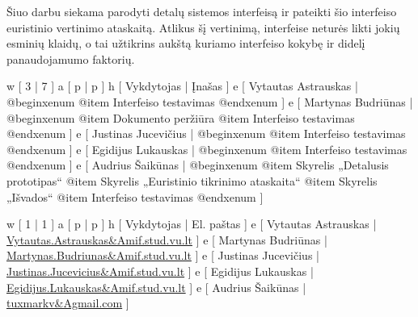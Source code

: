 
Šiuo darbu siekama parodyti detalų sistemos interfeisą ir pateikti šio interfeiso
euristinio vertinimo ataskaitą. Atlikus šį vertinimą, interfeise neturės likti
jokių esminių klaidų, o tai užtikrins aukštą kuriamo interfeiso kokybę ir didelį
panaudojamumo faktorių.

\xtable
{
  w [ 3  | 7 ]
  a [ p  | p ]
  h [ Vykdytojas | Įnašas ]
  e [ Vytautas Astrauskas
  | @begin{xenum} 
      @item Interfeiso testavimas
    @end{xenum}
  ]
  e [ Martynas Budriūnas
  | @begin{xenum} 
      @item Dokumento peržiūra
      @item Interfeiso testavimas
    @end{xenum}
  ]
  e [ Justinas Jucevičius 
  | @begin{xenum} 
      @item Interfeiso testavimas
    @end{xenum}
  ]
  e [ Egidijus Lukauskas 
  | @begin{xenum} 
      @item Interfeiso testavimas
    @end{xenum}
  ]
  e [ Audrius Šaikūnas 
  | @begin{xenum} 
      @item Skyrelis „Detalusis prototipas“
      @item Skyrelis „Euristinio tikrinimo ataskaita“
      @item Skyrelis „Išvados“
      @item Interfeiso testavimas
    @end{xenum}
  ]
}

\xtableu
{
  w [ 1 | 1 ]
  a [ p | p ]
  h [ Vykdytojas | El. paštas ]
  e [ Vytautas Astrauskas | \url{Vytautas.Astrauskas&Amif.stud.vu.lt} ]
  e [ Martynas Budriūnas  | \url{Martynas.Budriunas&Amif.stud.vu.lt} ]
  e [ Justinas Jucevičius | \url{Justinas.Jucevicius&Amif.stud.vu.lt} ]
  e [ Egidijus Lukauskas  | \url{Egidijus.Lukauskas&Amif.stud.vu.lt} ]
  e [ Audrius Šaikūnas    | \url{tuxmarkv&Agmail.com} ]
}
